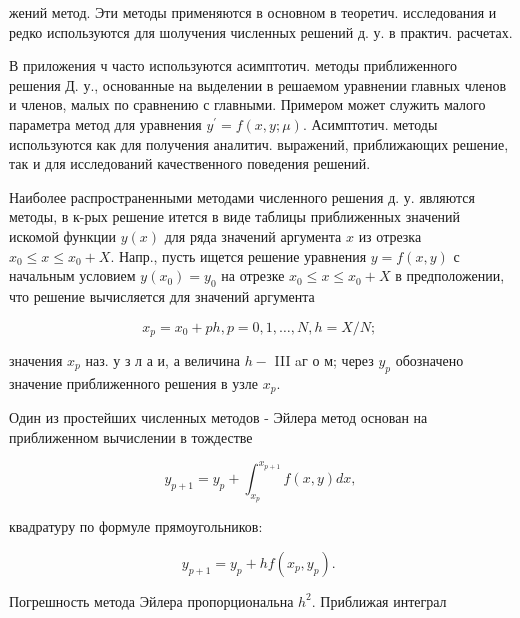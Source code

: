 \documentclass[10pt]{article}
\begin{document}
жений метод. Эти методы применяются в основном в теоретич. исследования и редко используются для шолучения численных решений д. у. в практич. расчетах.



В приложения ч часто используются асимптотич. методы приближенного решения Д. у., основанные на выделении в решаемом уравнении главных членов и членов, малых по сравнению с главными. Примером может служить малого параметра метод для уравнения $y^{\prime}=f(x, y ; \mu)$. Асимптотич. методы используются как для получения аналитич. выражений, приближающих решение, так и для исследований качественного поведения решений.



Наиболее распространенными методами численного решения д. у. являются методы, в к-рых решение итется в виде таблицы приближенных значений искомой функции $y(x)$ для ряда значений аргумента $x$ из отрезка $x_{0} \leqslant x \leqslant x_{0}+X$. Напр., пусть ищется решение уравнения $y=f(x, y)$ с начальным условием $y\left(x_{0}\right)=y_{0}$ на отрезке $x_{0} \leqslant x \leqslant x_{0}+X$ в предположении, что решение вычисляется для значений аргумента



\[

x_{p}=x_{0}+p h, p=0,1, \ldots, N, h=X / N \text {; }

\]



значения $x_{p}$ наз. у з л а и, а величина $h-$ III aг о м; через $y_{p}$ обозначено значение приближенного решения в узле $x_{p}$.



Один из простейших численных методов - Эйлера метод основан на приближенном вычислении в тождестве



\[

y_{p+1}=y_{p}+\int_{x_{p}}^{x_{p+1}} f(x, y) d x,

\]



квадратуру по формуле прямоугольников:



\[

y_{p+1}=y_{p}+h f\left(x_{p}, y_{p}\right) \text {. }

\]



Погрешность метода Эйлера пропорциональна $h^{2}$. Приближая интеграл
\end{document}
